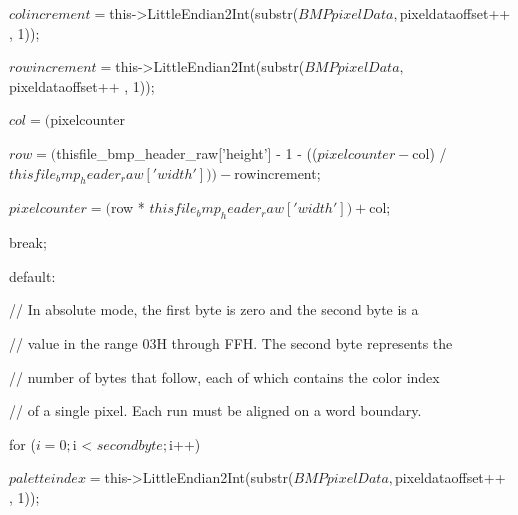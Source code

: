 \begin{DoxyCode}
{{{{      $colincrement = $this->LittleEndian2Int(substr($BMPpixelData, $pixeldataoffset++
      , 1));
                                                                                        
      $rowincrement = $this->LittleEndian2Int(substr($BMPpixelData, $pixeldataoffset++
      , 1));
                                                                                        
      $col = ($pixelcounter %
                                                                                        
      $row = ($thisfile_bmp_header_raw['height'] - 1 - (($pixelcounter - $col) / 
      $thisfile_bmp_header_raw['width'])) - $rowincrement;
                                                                                        
      $pixelcounter = ($row * $thisfile_bmp_header_raw['width']) + $col;
                                                                                        
      break;

                                                                                
      default:
                                                                                        
      // In absolute mode, the first byte is zero and the second byte is a
                                                                                        
      // value in the range 03H through FFH. The second byte represents the
                                                                                        
      // number of bytes that follow, each of which contains the color index
                                                                                        
      // of a single pixel. Each run must be aligned on a word boundary.
                                                                                        
      for ($i = 0; $i < $secondbyte; $i++) {
                                                                                                
      $paletteindex = $this->LittleEndian2Int(substr($BMPpixelData, $pixeldataoffset++
      , 1));
                                                                                                
}}}}}
\end{DoxyCode}
